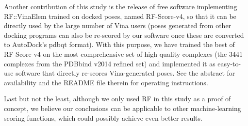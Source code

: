\documentclass[twocolumn]{bmcart}
\begin{document}
Another contribution of this study is the release of free software implementing RF::VinaElem trained on docked poses, named RF-Score-v4, so that it can be directly used by the large number of Vina users (poses generated from other docking programs can also be re-scored by our software once these are converted to AutoDock's pdbqt format). With this purpose, we have trained the best of RF-Score-v4 on the most comprehensive set of high-quality complexes (the 3441 complexes from the PDBbind v2014 refined set) and implemented it as easy-to-use software that directly re-scores Vina-generated poses. See the abstract for availability and the README file therein for operating instructions.

Last but not the least, although we only used RF in this study as a proof of concept, we believe our conclusions can be applicable to other machine-learning scoring functions, which could possibly achieve even better results.

\end{document}
